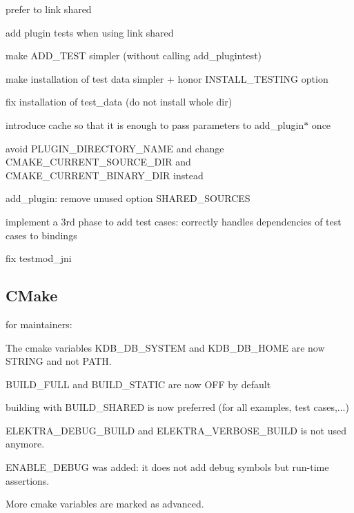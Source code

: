 \begin{DoxyItemize}
\item prefer to link shared
\item add plugin tests when using link shared
\item make A\+D\+D\+\_\+\+T\+E\+ST simpler (without calling add\+\_\+plugintest)
\item make installation of test data simpler + honor I\+N\+S\+T\+A\+L\+L\+\_\+\+T\+E\+S\+T\+I\+NG option
\item fix installation of test\+\_\+data (do not install whole dir)
\item introduce cache so that it is enough to pass parameters to {\ttfamily add\+\_\+plugin$\ast$} once
\item avoid P\+L\+U\+G\+I\+N\+\_\+\+D\+I\+R\+E\+C\+T\+O\+R\+Y\+\_\+\+N\+A\+ME and change C\+M\+A\+K\+E\+\_\+\+C\+U\+R\+R\+E\+N\+T\+\_\+\+S\+O\+U\+R\+C\+E\+\_\+\+D\+IR and C\+M\+A\+K\+E\+\_\+\+C\+U\+R\+R\+E\+N\+T\+\_\+\+B\+I\+N\+A\+R\+Y\+\_\+\+D\+IR instead
\item add\+\_\+plugin\+: remove unused option S\+H\+A\+R\+E\+D\+\_\+\+S\+O\+U\+R\+C\+ES
\item implement a 3rd phase to add test cases\+: correctly handles dependencies of test cases to bindings
\item fix testmod\+\_\+jni
\end{DoxyItemize}

\subsection*{C\+Make}

for maintainers\+:


\begin{DoxyItemize}
\item The cmake variables K\+D\+B\+\_\+\+D\+B\+\_\+\+S\+Y\+S\+T\+EM and K\+D\+B\+\_\+\+D\+B\+\_\+\+H\+O\+ME are now S\+T\+R\+I\+NG and not P\+A\+TH.
\item B\+U\+I\+L\+D\+\_\+\+F\+U\+LL and B\+U\+I\+L\+D\+\_\+\+S\+T\+A\+T\+IC are now O\+FF by default
\item building with B\+U\+I\+L\+D\+\_\+\+S\+H\+A\+R\+ED is now preferred (for all examples, test cases,...)
\item E\+L\+E\+K\+T\+R\+A\+\_\+\+D\+E\+B\+U\+G\+\_\+\+B\+U\+I\+LD and E\+L\+E\+K\+T\+R\+A\+\_\+\+V\+E\+R\+B\+O\+S\+E\+\_\+\+B\+U\+I\+LD is not used anymore.
\item E\+N\+A\+B\+L\+E\+\_\+\+D\+E\+B\+UG was added\+: it does not add debug symbols but run-\/time assertions.
\item More cmake variables are marked as advanced.
\end{DoxyItemize}

